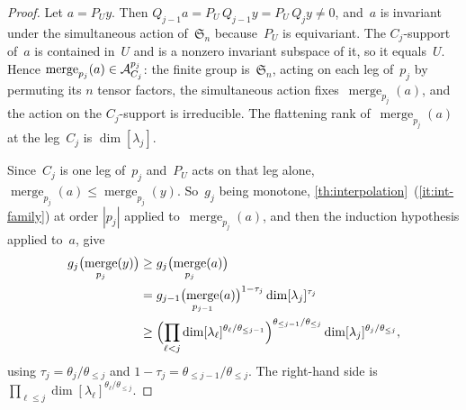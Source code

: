 \documentclass[11pt,letterpaper]{article}
\DeclareMathOperator{\merge}{merge}
\begin{document}
\begin{proof}
Let $a = P_U y$. Then $Q_{j-1} a = P_U \, Q_{j-1} y = P_U \, Q_j y \neq 0$, and~$a$ is invariant under the simultaneous action of~$\mathfrak{S}_n$ because~$P_U$ is equivariant. The $C_j$-support of~$a$ is contained in~$U$ and is a nonzero invariant subspace of it, so it equals~$U$. Hence $\merge_{p_j}(a) \in \mathcal{A}^{p_j}_{\smash[b]{C_j}}$: the finite group is~$\mathfrak{S}_n$, acting on each leg of~$p_j$ by permuting its $n$ tensor factors, the simultaneous action fixes~$\merge_{p_j}(a)$, and the action on the $C_j$-support is irreducible. The flattening rank of~$\merge_{p_j}(a)$ at the leg~$C_j$ is $\dim[\lambda_j]$.

Since~$C_j$ is one leg of~$p_j$ and~$P_U$ acts on that leg alone, $\merge_{p_j}(a) \leq \merge_{p_j}(y)$. So~$g_j$ being monotone, \cref{th:interpolation}~(\ref{it:int-family}) at order $|p_j|$ applied to~$\merge_{p_j}(a)$, and then the induction hypothesis applied to~$a$, give
\begin{align*}
g_j\bigl( \merge_{p_j}(y) \bigr)
&\geq g_j\bigl( \merge_{p_j}(a) \bigr)\\
&= g_{j-1}\bigl( \merge_{p_{j-1}}(a) \bigr)^{1 - \tau_j} \dim[\lambda_j]^{\tau_j}\\
&\geq \Bigl( \prod_{\ell < j} \dim[\lambda_\ell]^{\theta_\ell / \theta_{\leq j-1}} \Bigr)^{\theta_{\leq j-1}/\theta_{\leq j}} \dim[\lambda_j]^{\theta_j / \theta_{\leq j}},
\end{align*}
using $\tau_j = \theta_j/\theta_{\leq j}$ and $1 - \tau_j = \theta_{\leq j-1}/\theta_{\leq j}$. The right-hand side is $\prod_{\ell \leq j} \dim[\lambda_\ell]^{\theta_\ell/\theta_{\leq j}}$.
\end{proof}
\end{document}

